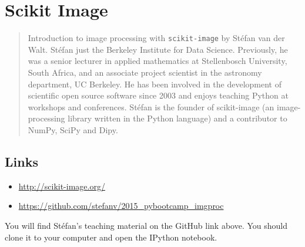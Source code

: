\chapter{Scikit Image}

\begin{abstract}
Introduction to image processing with \texttt{scikit-image} by Stéfan van der
Walt. Stéfan just the Berkeley Institute for Data Science. Previously, he was a
senior lecturer in applied mathematics at Stellenbosch University, South
Africa, and an associate project scientist in the astronomy department, UC
Berkeley. He has been involved in the development of scientific open source
software since 2003 and enjoys teaching Python at workshops and conferences.
Stéfan is the founder of scikit-image (an image-processing library written in
the Python language) and a contributor to NumPy, SciPy and Dipy.
\end{abstract}

\section{Links}
\begin{itemize}
\item \url{http://scikit-image.org/}
\item \url{https://github.com/stefanv/2015_pybootcamp_imgproc}
\end{itemize}

You will find Stéfan's teaching material on the GitHub link above.  You should
clone it to your computer and open the IPython notebook.
